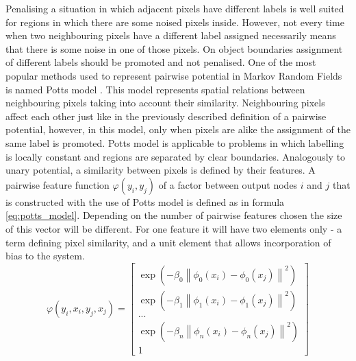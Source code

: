Penalising a situation in which adjacent pixels have different labels is well suited for regions in which there are some noised pixels inside. However, not every time when two neighbouring pixels have a different label assigned necessarily means that there is some noise in one of those pixels. On object boundaries assignment of different labels should be promoted and not penalised. One of the most popular methods used to represent pairwise potential in Markov Random Fields is named Potts model \cite{potts_model}. This model represents spatial relations between neighbouring pixels taking into account their similarity. Neighbouring pixels affect each other just like in the previously described definition of a pairwise potential, however, in this model, only when pixels are alike the assignment of the same label is promoted. Potts model is applicable to problems in which labelling is locally constant and regions are separated by clear boundaries. Analogously to unary potential, a similarity between pixels is defined by their features. A pairwise feature function $\varphi(y_i,y_j)$ of a factor between output nodes $i$ and $j$ that is constructed with the use of Potts model is defined as in formula \ref{eq:potts_model}. Depending on the number of pairwise features chosen the size of this vector will be different. For one feature it will have two elements only - a term defining pixel similarity, and a unit element that allows incorporation of bias to the system.
\begin{equation}
    \label{eq:potts_model}
    \varphi(y_i,x_i,y_j,x_j) = \begin{bmatrix}
        \exp{(-\beta_0 \left \| \phi_0(x_i) - \phi_0(x_j)\right \|^2)} \\
        \exp{(-\beta_1 \left \| \phi_1(x_i) - \phi_1(x_j)\right \|^2)} \\
        ...             \\
        \exp{(-\beta_n \left \| \phi_n(x_i) - \phi_n(x_j)\right \|^2)} \\
        1
    \end{bmatrix}
\end{equation}

